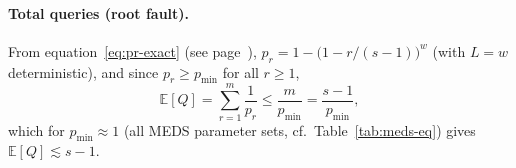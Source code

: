 \paragraph{Total queries (root fault).}
From equation~\eqref{eq:pr-exact} (see page~\pageref{eq:pr-exact}),
\(p_r = 1 - \bigl(1 - r/(s-1)\bigr)^{w}\) (with \(L = w\) deterministic),
and since \(p_r \geq p_{\min}\) for all \(r \geq 1\),
\[
  \mathbb{E}[Q] = \sum_{r=1}^{m} \frac{1}{p_r} \leq \frac{m}{p_{\min}}
  = \frac{s-1}{p_{\min}},
\]
which for \(p_{\min} \approx 1\) (all MEDS parameter sets, cf.\ Table~\ref{tab:meds-eq})
gives \(\mathbb{E}[Q] \lesssim s-1\).